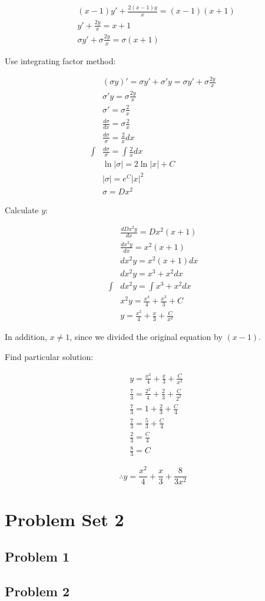 \documentclass[titlepage]{article}
\begin{document}
\begin{align*}
  & (x-1)y' + \frac{2(x-1)y}{x} = (x-1)(x+1)
  \\ & y' + \frac{2y}{x} = x+1 \tag{$x \neq 1$}
  \\ & \sigma y' + \sigma \frac{2y}{x} = \sigma(x+1)
\end{align*}

Use integrating factor method:

\begin{align*}
  & (\sigma y)' = \sigma y' + \sigma' y = \sigma y' + \sigma \frac{2y}{x}
  \\ & \sigma' y = \sigma \frac{2y}{x}
  \\ & \sigma' = \sigma \frac{2}{x}
  \\ & \frac{d\sigma}{dx} = \sigma \frac{2}{x}
  \\ & \frac{d\sigma}{\sigma} = \frac{2}{x} dx
  \\ \int & \frac{d\sigma}{\sigma} = \int \frac{2}{x} dx
  \\ & \ln|\sigma| = 2 \ln|x| + C
  \\ & |\sigma| = e^C|x|^2 \tag{$x \neq 0$}
  \\ & \sigma = Dx^2
\end{align*}

Calculate $y$:

\begin{align*}
  & \frac{dDx^2y}{dx} = Dx^2(x+1)
  \\ & \frac{dx^2y}{dx} = x^2(x+1)
  \\ & dx^2y = x^2(x+1) dx
  \\ & dx^2y = x^3 + x^2 dx
  \\ \int & dx^2y = \int x^3 + x^2 dx
  \\ & x^2y = \frac{x^4}{4} + \frac{x^3}{3} + C
  \\ & y = \frac{x^2}{4} + \frac{x}{3} + \frac{C}{x^2} \tag{$x \neq 0 $}
\end{align*}

In addition, $x \neq 1$, since we divided the original equation by $(x-1)$.

Find particular solution:

\begin{align*}
  & y = \frac{x^2}{4} + \frac{x}{3} + \frac{C}{x^2}
  \\ & \frac{7}{3} = \frac{2^2}{4} + \frac{2}{3} + \frac{C}{2^2}
  \\ & \frac{7}{3} = 1 + \frac{2}{3} + \frac{C}{4}
  \\ & \frac{7}{3} = \frac{5}{3} + \frac{C}{4}
  \\ & \frac{2}{3} = \frac{C}{4}
  \\ & \frac{8}{3} = C
\end{align*}

$$\therefore y = \frac{x^2}{4} + \frac{x}{3} + \frac{8}{3x^2}$$

\section{Problem Set 2}
\subsection{Problem 1}
\subsection{Problem 2}
\end{document}
